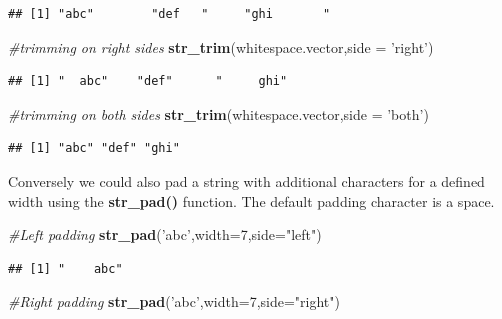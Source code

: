 \documentclass[]{book}
\newenvironment{Shaded}{\begin{snugshade}}{\end{snugshade}}
\newcommand{\KeywordTok}[1]{\textcolor[rgb]{0.13,0.29,0.53}{\textbf{{#1}}}}
\newcommand{\DataTypeTok}[1]{\textcolor[rgb]{0.13,0.29,0.53}{{#1}}}
\newcommand{\DecValTok}[1]{\textcolor[rgb]{0.00,0.00,0.81}{{#1}}}
\newcommand{\StringTok}[1]{\textcolor[rgb]{0.31,0.60,0.02}{{#1}}}
\newcommand{\CommentTok}[1]{\textcolor[rgb]{0.56,0.35,0.01}{\textit{{#1}}}}
\newcommand{\NormalTok}[1]{{#1}}
\begin{document}
\begin{verbatim}
## [1] "abc"        "def   "     "ghi       "
\end{verbatim}

\begin{Shaded}
\begin{Highlighting}[]
\CommentTok{#trimming on right sides}
\KeywordTok{str_trim}\NormalTok{(whitespace.vector,}\DataTypeTok{side =} \StringTok{'right'}\NormalTok{)}
\end{Highlighting}
\end{Shaded}

\begin{verbatim}
## [1] "  abc"    "def"      "     ghi"
\end{verbatim}

\begin{Shaded}
\begin{Highlighting}[]
\CommentTok{#trimming on both sides}
\KeywordTok{str_trim}\NormalTok{(whitespace.vector,}\DataTypeTok{side =} \StringTok{'both'}\NormalTok{)}
\end{Highlighting}
\end{Shaded}

\begin{verbatim}
## [1] "abc" "def" "ghi"
\end{verbatim}

Conversely we could also pad a string with additional characters for a
defined width using the \textbf{str\_pad()} function. The default
padding character is a space.

\begin{Shaded}
\begin{Highlighting}[]
\CommentTok{#Left padding}
\KeywordTok{str_pad}\NormalTok{(}\StringTok{'abc'}\NormalTok{,}\DataTypeTok{width=}\DecValTok{7}\NormalTok{,}\DataTypeTok{side=}\StringTok{"left"}\NormalTok{)}
\end{Highlighting}
\end{Shaded}

\begin{verbatim}
## [1] "    abc"
\end{verbatim}

\begin{Shaded}
\begin{Highlighting}[]
\CommentTok{#Right padding}
\KeywordTok{str_pad}\NormalTok{(}\StringTok{'abc'}\NormalTok{,}\DataTypeTok{width=}\DecValTok{7}\NormalTok{,}\DataTypeTok{side=}\StringTok{"right"}\NormalTok{)}
\end{Highlighting}
\end{Shaded}
\end{document}
